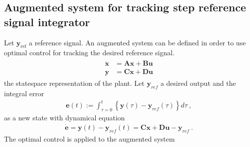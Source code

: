 \documentclass[letterpaper,10pt,english]{jupyterBook}
\begin{document}
\subsection{Augmented system for tracking step reference signal \sphinxhyphen{} integrator}
\label{\detokenize{ch/control/optimal-control-ref-tracking:augmented-system-for-tracking-step-reference-signal-integrator}}\label{\detokenize{ch/control/optimal-control-ref-tracking:control-optimal-ref-tracking-step}}
\sphinxAtStartPar
Let \(\mathbf{y}_{\text{ref}}\) a reference signal. An augmented system can be defined in order to use optimal control for tracking the desired reference signal.
\begin{equation*}
\begin{split}\begin{aligned}
 \dot{\mathbf{x}} & = \mathbf{A} \mathbf{x} + \mathbf{B} \mathbf{u} \\
      \mathbf{y}  & = \mathbf{C} \mathbf{x} + \mathbf{D} \mathbf{u}
\end{aligned}\end{split}
\end{equation*}
\sphinxAtStartPar
the state\sphinxhyphen{}space representation of the plant. Let \(\mathbf{y}_{ref}\) a desired output and the integral error
\begin{equation*}
\begin{split}\mathbf{e}(t) := \int_{\tau=0}^{t} \left\{ \mathbf{y}(\tau) - \mathbf{y}_{ref}(\tau) \right\} d \tau \ ,\end{split}
\end{equation*}
\sphinxAtStartPar
as a new state with dynamical equation
\begin{equation*}
\begin{split}\dot{\mathbf{e}} = \mathbf{y}(t) - \mathbf{y}_{ref}(t) = \mathbf{C} \mathbf{x} + \mathbf{D} \mathbf{u} - \mathbf{y}_{ref} \ .\end{split}
\end{equation*}
\sphinxAtStartPar
The optimal control is applied to the augmented system
\end{document}
